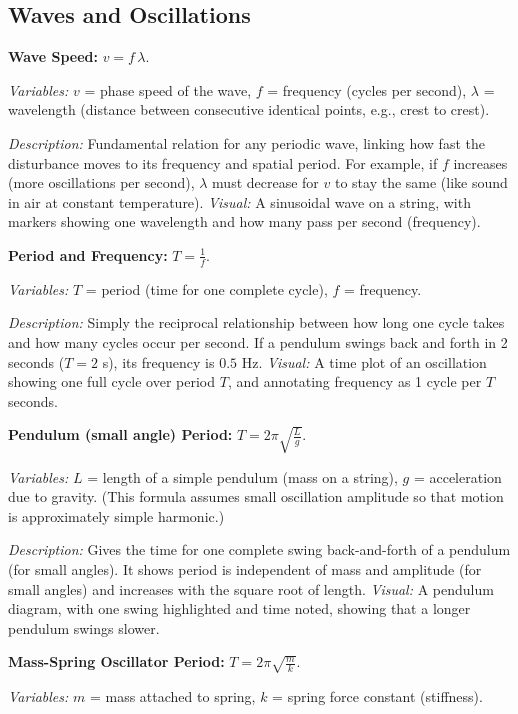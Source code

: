 \documentclass{article}
\begin{document}
\subsection*{Waves and Oscillations}

\textbf{Wave Speed:} $v = f \,\lambda$.

\textit{Variables:} $v$ = phase speed of the wave, $f$ = frequency (cycles per second), $\lambda$ = wavelength (distance between consecutive identical points, e.g., crest to crest).

\textit{Description:} Fundamental relation for any periodic wave, linking how fast the disturbance moves to its frequency and spatial period. For example, if $f$ increases (more oscillations per second), $\lambda$ must decrease for $v$ to stay the same (like sound in air at constant temperature). \textit{Visual:} A sinusoidal wave on a string, with markers showing one wavelength and how many pass per second (frequency).

\textbf{Period and Frequency:} $T = \frac{1}{f}$.

\textit{Variables:} $T$ = period (time for one complete cycle), $f$ = frequency.

\textit{Description:} Simply the reciprocal relationship between how long one cycle takes and how many cycles occur per second. If a pendulum swings back and forth in 2 seconds ($T=2$ s), its frequency is $0.5$ Hz. \textit{Visual:} A time plot of an oscillation showing one full cycle over period $T$, and annotating frequency as 1 cycle per $T$ seconds.

\textbf{Pendulum (small angle) Period:} $T = 2\pi \sqrt{\frac{L}{g}}$.

\textit{Variables:} $L$ = length of a simple pendulum (mass on a string), $g$ = acceleration due to gravity. (This formula assumes small oscillation amplitude so that motion is approximately simple harmonic.)

\textit{Description:} Gives the time for one complete swing back-and-forth of a pendulum (for small angles). It shows period is independent of mass and amplitude (for small angles) and increases with the square root of length. \textit{Visual:} A pendulum diagram, with one swing highlighted and time noted, showing that a longer pendulum swings slower.

\textbf{Mass-Spring Oscillator Period:} $T = 2\pi \sqrt{\frac{m}{k}}$.

\textit{Variables:} $m$ = mass attached to spring, $k$ = spring force constant (stiffness).
\end{document}
